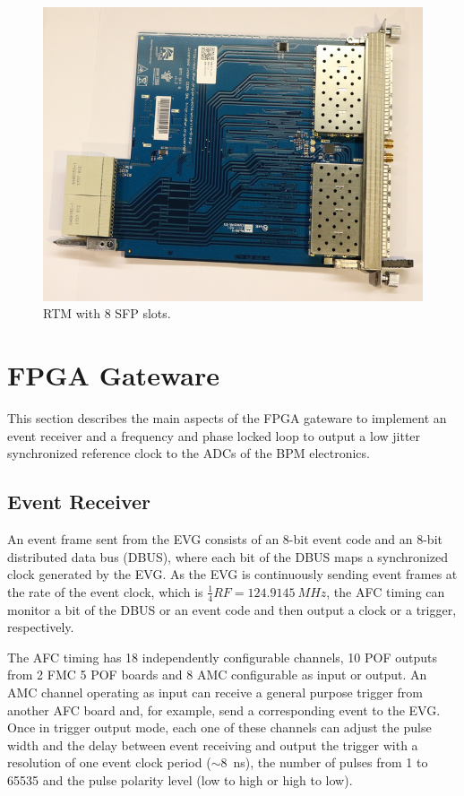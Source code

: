 \documentclass[a4paper,
               biblatex,      %
               ]{jacow}
\begin{document}
\begin{figure}[!htb]
   \centering
   \includegraphics*[width=0.8\columnwidth]{RTM_SFP_resized}
   \caption{RTM with 8 SFP slots.}
   \label{fig:rtm_sfp}
\end{figure}

\section{FPGA Gateware}

This section describes the main aspects of the FPGA gateware to implement an event receiver and a frequency and phase locked loop to output a low jitter synchronized reference clock to the ADCs of the BPM electronics.

\subsection{Event Receiver}

An event frame sent from the EVG consists of an 8-bit event code and an 8-bit distributed data bus (DBUS), where each bit of the DBUS maps a synchronized clock generated by the EVG.
As the EVG is continuously sending event frames at the rate of the event clock, which is $\frac{1}{4}RF=124.9145~MHz$, the AFC timing can monitor a bit of the DBUS or an event code and then output a clock or a trigger, respectively. 

The AFC timing has 18 independently configurable channels, 10 POF outputs from 2 FMC 5 POF boards and 8 AMC configurable as input or output. An AMC channel operating as input can receive a general purpose trigger from another AFC board and, for example, send a corresponding event to the EVG. Once in trigger output mode, each one of these channels can adjust the pulse width and the delay between event receiving and output the trigger with a resolution of one event clock period ($\sim$8~ns), the number of pulses from 1 to 65535 and the pulse polarity level (low to high or high to low).  
\end{document}
